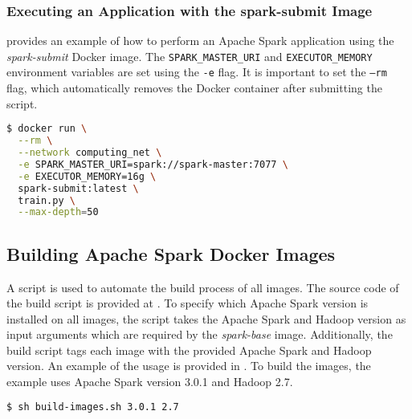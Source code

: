 \subsubsection{Executing an Application with the spark-submit Image}
% 
 provides an example of how to perform an Apache Spark application using the \textit{spark-submit} Docker image.
The \texttt{SPARK\_MASTER\_URI} and \texttt{EXECUTOR\_MEMORY} environment variables are set using the \texttt{-e} flag.
%
It is important to set the \texttt{--rm} flag, which automatically removes the Docker container after submitting the script.
\begin{lstlisting}[label=lst:06_env_depl_submit_example, caption=Example of the spark-submit image, language=bash, numbers=none]
$ docker run \
  --rm \
  --network computing_net \
  -e SPARK_MASTER_URI=spark://spark-master:7077 \
  -e EXECUTOR_MEMORY=16g \
  spark-submit:latest \
  train.py \
  --max-depth=50
\end{lstlisting}


\subsection{Building Apache Spark Docker Images}
\label{subsec:07_spark_building-images}
A script is used to automate the build process of all images.
The source code of the build script is provided at .
To specify which Apache Spark version is installed on all images, the script takes the Apache Spark and Hadoop version as input arguments which are required by the \textit{spark-base} image.
Additionally, the build script tags each image with the provided Apache Spark and Hadoop version.
An example of the usage is provided in .
To build the images, the example uses Apache Spark version 3.0.1 and Hadoop 2.7.
\begin{lstlisting}[label=lst:06_env_depl_build_example, caption=Example of the spark-submit image, language=bash, numbers=none]
$ sh build-images.sh 3.0.1 2.7
\end{lstlisting}


